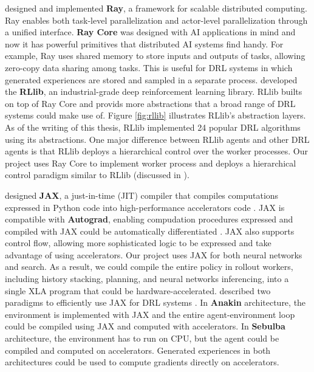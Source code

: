 \citeauthor{RayDistributedFramework_Moritz.Nishihara.ea_2018} designed and implemented \textbf{Ray}, a framework for scalable distributed computing.
Ray enables both task-level parallelization and actor-level parallelization through a unified interface.
\textbf{Ray Core} was designed with AI applications in mind and now it has powerful primitives that distributed AI systems find handy.
For example, Ray uses shared memory to store inputs and outputs of tasks, allowing zero-copy data sharing among tasks.
This is useful for DRL systems in which generated experiences are stored and sampled in a separate process.
\citeauthor{RLlibAbstractionsDistributed_Liang.Liaw.ea_2018} developed the \textbf{RLlib}, an industrial-grade deep reinforcement learning library.
RLlib builts on top of Ray Core and provids more abstractions that a broad range of DRL systems could make use of.
Figure \ref{fig:rllib} illustrates RLlib's abstraction layers.
As of the writing of this thesis, RLlib implemented 24 popular DRL algorithms using its abstractions.
One major difference between RLlib agents and other DRL agents is that RLlib deploys a hierarchical control over the worker processes.
Our project uses Ray Core to implement worker process and deploys a hierarchical control paradigm similar to RLlib (discussed in ).

\citeauthor{CompilingMachineLearning_Frostig.Johnson.ea_} designed \textbf{JAX}, a just-in-time (JIT) compiler that compiles computations expressed in Python code into high-performance accelerators code \cite{CompilingMachineLearning_Frostig.Johnson.ea_}.
JAX is compatible with \textbf{Autograd}, enabling compudation procedures expressed and compiled with JAX could be automatically differentiated .
JAX also supports control flow, allowing more sophisticated logic to be expressed and take advantage of using accelerators.
Our project uses JAX for both neural networks and search.
As a result, we could compile the entire policy in rollout workers, including history stacking, planning, and neural networks inferencing, into a single XLA program that could be hardware-accelerated.
\citeauthor{PodracerArchitecturesScalable_Hessel.Kroiss.ea_2021} described two paradigms to efficiently use JAX for DRL systems \cite{PodracerArchitecturesScalable_Hessel.Kroiss.ea_2021}.
In \textbf{Anakin} architecture, the environment is implemented with JAX and the entire agent-environment loop could be compiled using JAX and computed with accelerators.
In \textbf{Sebulba} architecture, the environment has to run on CPU, but the agent could be compiled and computed on accelerators.
Generated experiences in both architectures could be used to compute gradients directly on accelerators.